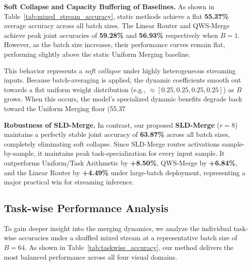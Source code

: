 \textbf{Soft Collapse and Capacity Buffering of Baselines.}
As shown in Table~\ref{tab:mixed_stream_accuracy}, static methods achieve a flat \textbf{55.37\%} average accuracy across all batch sizes. The Linear Router and QWS-Merge achieve peak joint accuracies of \textbf{59.28\%} and \textbf{56.93\%} respectively when $B=1$. However, as the batch size increases, their performance curves remain flat, performing slightly above the static Uniform Merging baseline. 

This behavior represents a \emph{soft collapse} under highly heterogeneous streaming inputs. Because batch-averaging is applied, the dynamic coefficients smooth out towards a flat uniform weight distribution (e.g., $\approx [0.25, 0.25, 0.25, 0.25]$) as $B$ grows. When this occurs, the model's specialized dynamic benefits degrade back toward the Uniform Merging floor (55.37%

\textbf{Robustness of SLD-Merge.}
In contrast, our proposed \textbf{SLD-Merge} ($r=8$) maintains a perfectly stable joint accuracy of \textbf{63.87\%} across all batch sizes, completely eliminating soft collapse. Since SLD-Merge routes activations sample-by-sample, it maintains peak task-specialization for every input sample. It outperforms Uniform/Task Arithmetic by \textbf{+8.50\%}, QWS-Merge by \textbf{+6.84\%}, and the Linear Router by \textbf{+4.49\%} under large-batch deployment, representing a major practical win for streaming inference.

\subsection{Task-wise Performance Analysis}
To gain deeper insight into the merging dynamics, we analyze the individual task-wise accuracies under a shuffled mixed stream at a representative batch size of $B=64$. As shown in Table~\ref{tab:taskwise_accuracy}, our method delivers the most balanced performance across all four visual domains.

